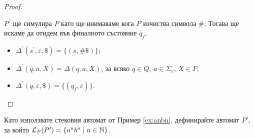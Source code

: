 \begin{proof}
\begin{enumerate}[1)]
    $P^\prime$ ще симулира $P$ като ще внимаваме кога $P$ изчиства символа $\#$. Тогава ще искаме да отидем във финалното състояние $q_f$.
    \begin{itemize}
    \item 
      $\Delta^\prime(s^\prime,\varepsilon,\$) = \{(s, \#\$)\}$;
    \item
      $\Delta^\prime(q,a,X) = \Delta(q,a,X)$, за всяко $q \in Q$, $a \in \Sigma_\varepsilon$, $X \in \Gamma$;
    \item
      $\Delta^\prime(q,\varepsilon,\$) = \{(q_f,\varepsilon)\}$.
    \end{itemize}
  \end{enumerate}
\end{proof}

\begin{problem}
  Като използвате стековия автомат от Пример \ref{ex:anbn}, дефинирайте автомат $P'$, за който
  $\mathcal{L}_F(P') = \{a^nb^n \mid n\in\mathbb{N}\}$.
\end{problem}

